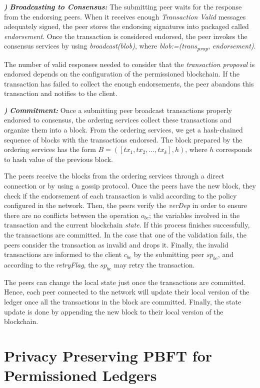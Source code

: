 \documentclass[conference]{llncs}
\newcounter{paranum}
\newcommand{\Par}{\vspace{10pt}\noindent\textbf{\refstepcounter{paranum}\theparanum}\textbf\textit) }
\begin{document}
\Par{\textit{\textbf{Broadcasting to Consensus:}}} The submitting peer waits for the response from the endorsing peers. When it receives enough \textit{Transaction Valid} messages adequately signed, the peer stores the endorsing signatures into packaged called \textit{endorsement}. Once the transaction is considered endorsed, the peer invokes the consensus services by using \textit{broadcast(blob)}, where \textit{blob:=(trans\textsubscript{prop}}, \textit{endorsement)}.

The number of valid responses needed to consider that the \textit{transaction proposal} is endorsed depends on the configuration of the permissioned blockchain. If the transaction has failed to collect the enough endorsements, the peer abandons this transaction and notifies to the client.

\Par{\textit{\textbf{Commitment:}}} Once a submitting peer broadcast transactions properly endorsed to consensus, the ordering services collect these transactions and organize them into a block. From the ordering services, we get a hash-chained sequence of blocks with the transactions endorsed. The block prepared by the ordering services has the form $B=\left(\left[tx_1,tx_2,...,tx_k\right],h\right)$, where $h$ corresponds to hash value of the previous block.

The peers receive the blocks from the ordering services through a direct connection or by using a gossip protocol. Once the peers have the new block, they check if the endorsement of each transaction is valid according to the policy configured in the network. Then, the peers verify the \textit{verDep} in order to ensure there are no conflicts between the operation $o_{bc}$; the variables involved in the transaction and the current blockchain \textit{state}. If this process finishes successfully, the transactions are committed. In the case that one of the validation fails, the peers consider the transaction as invalid and drops it. Finally, the invalid transactions are informed to the client $c_{bc}$ by the submitting peer $sp_{bc}$, and according to the \textit{retryFlag}, the $sp_{bc}$ may retry the transaction.

The peers can change the local state just once the transactions are committed. Hence, each peer connected to the network will update their local version of the ledger once all the transactions in the block are committed. Finally, the state update is done by appending the new block to their local version of the blockchain.

\section{Privacy Preserving PBFT for Permissioned Ledgers}\label{PPPBFT}
\end{document}
